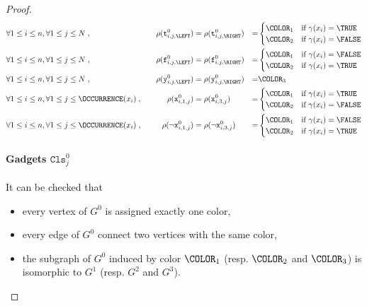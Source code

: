 \begin{proof}
  \begin{alignat*}{4}
    &\forall 1 \leq i \leq n, \forall 1 \leq j \leq N\;,
    &\quad
    \rho(\texttt{t}^{0}_{i, j, \LEFT}) &= \rho(\texttt{t}^{0}_{i, j, \RIGHT}) &=&
    \begin{cases}
      \COLOR_1 & \text{if $\gamma(x_i) = \TRUE$}\\
      \COLOR_2 & \text{if $\gamma(x_i) = \FALSE$}
    \end{cases}
    \\
    &\forall 1 \leq i \leq n, \forall 1 \leq j \leq N\;,
    &\quad
    \rho(\texttt{f}^{0}_{i, j, \LEFT}) &= \rho(\texttt{f}^{0}_{i, j, \RIGHT}) &=&
    \begin{cases}
      \COLOR_1 & \text{if $\gamma(x_i) = \FALSE$}\\
      \COLOR_2 & \text{if $\gamma(x_i) = \TRUE$}
    \end{cases}
    \\
    &\forall 1 \leq i \leq n, \forall 1 \leq j \leq N\;,
    &\quad
    \rho(\texttt{y}^{0}_{i, j, \LEFT}) &= \rho(\texttt{y}^{0}_{i, j, \RIGHT}) &=&
    \COLOR_3
    \\
    &\forall 1 \leq i \leq n, \forall 1 \leq j \leq \OCCURRENCE(x_i)\;,
    &\quad
    \rho(\texttt{x}^{0}_{i, 1, j}) &= \rho(\texttt{x}^{0}_{i, 3, j}) &=&
    \begin{cases}
      \COLOR_1 & \text{if $\gamma(x_i) = \TRUE$}\\
      \COLOR_2 & \text{if $\gamma(x_i) = \FALSE$}
    \end{cases}
    \\
    &\forall 1 \leq i \leq n, \forall 1 \leq j \leq \OCCURRENCE(x_i)\;,
    &\quad
    \rho(\neg\texttt{x}^{0}_{i, 1, j}) &= \rho(\neg\texttt{x}^{0}_{i, 3, j}) &=&
    \begin{cases}
      \COLOR_1 & \text{if $\gamma(x_i) = \FALSE$}\\
      \COLOR_2 & \text{if $\gamma(x_i) = \TRUE$}
    \end{cases}
    \\
  \end{alignat*}

  \paragraph*{Gadgets $\texttt{Cls}^{0}_{j}$}

  It can be checked that
  \begin{itemize}
    \item
    every vertex of $G^{0}$ is assigned exactly one color,
    \item
    every edge of $G^{0}$ connect two vertices with the same color,
    \item
    the subgraph of $G^{0}$ induced by color $\COLOR_1$
    (resp. $\COLOR_2$ and $\COLOR_3$) is isomorphic to $G^{1}$
    (resp. $G^{2}$ and $G^{3}$).
  \end{itemize}


\end{proof}
